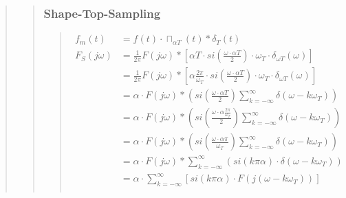 \begin{quote}
\begin{quote}
        \subsubsection{Shape-Top-Sampling}
        \begin{quote}
            \begin{equation*}
                \begin{split}
                    f_m (t)   &= f(t) \cdot \sqcap_{\alpha T} (t) \ast \delta_T (t) \\
                    F_S (j\omega) &= \frac{1}{2\pi} F (j\omega) \ast \left [
                    \alpha T \cdot si \left( \frac{\omega \cdot \alpha T}{2} \right) \cdot \omega_T \cdot \delta_{\omega
                    T} (\omega) \right] \\
                    &= \frac{1}{2\pi} F (j\omega) \ast \left [
                    \alpha \frac{2 \pi}{\omega_T} \cdot si \left( \frac{\omega \cdot \alpha T}{2} \right) \cdot \omega_T
                    \cdot \delta_{\omega T} (\omega) \right] \\
                    &= \alpha \cdot F (j \omega) \ast \left ( si \left( \frac{\omega \cdot \alpha T}{2} \right)
                    \sum_{k=-\infty}^{\infty} \delta (\omega - k\omega_T) \right)\\
                    &= \alpha \cdot F (j \omega) \ast \left ( si \left( \frac{\omega \cdot \alpha \frac{2
                    \pi}{\omega_T}}{2} \right) \sum_{k=-\infty}^{\infty} \delta (\omega - k\omega_T) \right)\\
                    &= \alpha \cdot F (j \omega) \ast \left ( si \left( \frac{\omega \cdot \alpha \pi}{\omega_T}
                    \right) \sum_{k=-\infty}^{\infty} \delta (\omega - k\omega_T) \right)\\
                    &= \alpha \cdot F (j \omega) \ast \sum_{k=-\infty}^{\infty} (si(k \pi \alpha) \cdot \delta (\omega -
                    k\omega_T))\\
                    &= \alpha \cdot \sum_{k=-\infty}^{\infty} \left [ si(k \pi \alpha) \cdot F (j(\omega - k\omega_T))
                    \right]\\
                \end{split}
            \end{equation*}
        \end{quote} %
        

\end{quote}
\end{quote}
